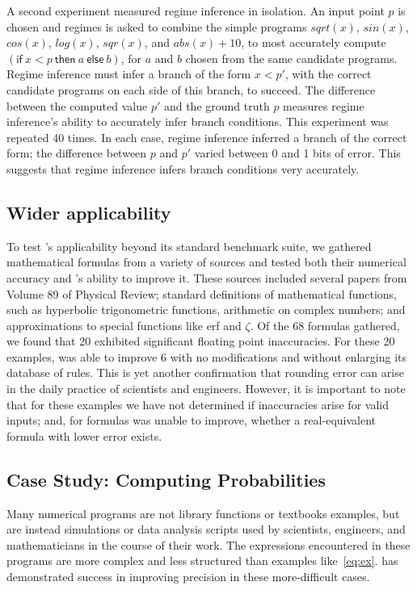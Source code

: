 \documentclass[paper.tex]{subfiles}
\begin{document}
A second experiment measured regime inference in isolation.
An input point $p$ is chosen and regimes is asked to combine the simple
programs $sqrt(x)$, $sin(x)$, $cos(x)$, $log(x)$, $sqr(x)$,
and $abs(x) + 10$, to most accurately compute $(\mathsf{if}\:x <
p\:\mathsf{then}\:a\:\mathsf{else}\:b)$, for $a$ and $b$ chosen from
the same candidate programs.  Regime inference must infer a branch of the
form $x < p'$, with the correct candidate programs on each side of
this branch, to succeed.
The difference between the computed value $p'$ and
the ground truth $p$ measures regime inference's ability to accurately
infer branch conditions.  This experiment was repeated 40 times.  In
each case, regime inference inferred a branch of the correct form; the
difference between $p$ and $p'$ varied between 0 and 1 bits of error.
This suggests that regime inference infers branch conditions very
accurately.

\subsection{Wider applicability}

To test \casio's applicability beyond its standard benchmark suite, we
gathered mathematical formulas from a variety of sources and tested
both their numerical accuracy and \casio's ability to improve it.
These sources included several papers from Volume 89 of Physical
Review; standard definitions of mathematical functions, such as
hyperbolic trigonometric functions, arithmetic on complex numbers; and
approximations to special functions like \textsf{erf} and $\zeta$.  Of the
68 formulas gathered, we found that 20 exhibited significant floating
point inaccuracies.  For these 20 examples, \casio was able to improve
6 with no modifications and without enlarging its database of rules.
This is yet another confirmation that rounding error can arise in the
daily practice of scientists and engineers.  However, it is important
to note that for these examples we have not determined if inaccuracies
arise for valid inputs; and, for formulas \casio was unable to
improve, whether a real-equivalent formula with lower error exists.

\subsection{Case Study: Computing Probabilities}

Many numerical programs are not library functions or textbooks
examples, but are instead simulations or data analysis scripts used by
scientists, engineers, and mathematicians in the course of their work.
The expressions encountered in these programs are more complex and
less structured than examples like~\eqref{eq:ex}.  \casio has
demonstrated success in improving precision in these more-difficult
cases.
\end{document}
